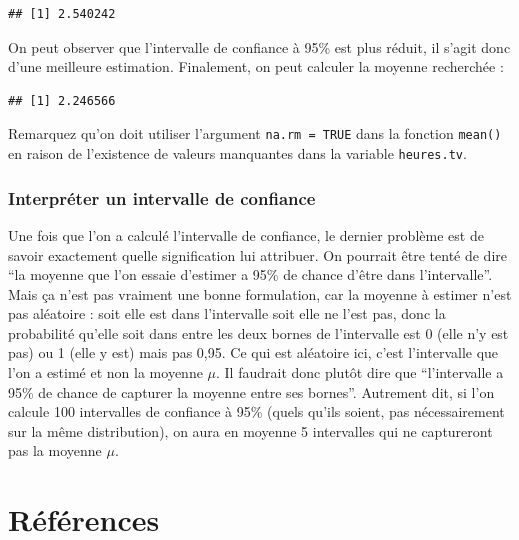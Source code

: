 \documentclass[
]{book}
\newenvironment{Shaded}{\begin{snugshade}}{\end{snugshade}}
\newcommand{\AttributeTok}[1]{\textcolor[rgb]{0.77,0.63,0.00}{#1}}
\newcommand{\ConstantTok}[1]{\textcolor[rgb]{0.00,0.00,0.00}{#1}}
\newcommand{\FunctionTok}[1]{\textcolor[rgb]{0.00,0.00,0.00}{#1}}
\newcommand{\NormalTok}[1]{#1}
\newcommand{\SpecialCharTok}[1]{\textcolor[rgb]{0.00,0.00,0.00}{#1}}
\begin{document}
\begin{verbatim}
## [1] 2.540242
\end{verbatim}

On peut observer que l'intervalle de confiance à 95\% est plus réduit, il s'agit donc d'une meilleure estimation. Finalement, on peut calculer la moyenne recherchée :

\begin{Shaded}
\end{Shaded}

\begin{verbatim}
## [1] 2.246566
\end{verbatim}

Remarquez qu'on doit utiliser l'argument \texttt{na.rm\ =\ TRUE} dans la fonction \texttt{mean()} en raison de l'existence de valeurs manquantes dans la variable \texttt{heures.tv}.

\hypertarget{interpruxe9ter-un-intervalle-de-confiance}{%
\subsection{Interpréter un intervalle de confiance}\label{interpruxe9ter-un-intervalle-de-confiance}}

Une fois que l'on a calculé l'intervalle de confiance, le dernier problème est de savoir exactement quelle signification lui attribuer. On pourrait être tenté de dire ``la moyenne que l'on essaie d'estimer a 95\% de chance d'être dans l'intervalle''. Mais ça n'est pas vraiment une bonne formulation, car la moyenne à estimer n'est pas aléatoire : soit elle est dans l'intervalle soit elle ne l'est pas, donc la probabilité qu'elle soit dans entre les deux bornes de l'intervalle est 0 (elle n'y est pas) ou 1 (elle y est) mais pas 0,95. Ce qui est aléatoire ici, c'est l'intervalle que l'on a estimé et non la moyenne \(\mu\). Il faudrait donc plutôt dire que ``l'intervalle a 95\% de chance de capturer la moyenne entre ses bornes''. Autrement dit, si l'on calcule 100 intervalles de confiance à 95\% (quels qu'ils soient, pas nécessairement sur la même distribution), on aura en moyenne 5 intervalles qui ne captureront pas la moyenne \(\mu\).

\hypertarget{ruxe9fuxe9rences}{%
\chapter*{Références}\label{ruxe9fuxe9rences}}

  
\end{document}
